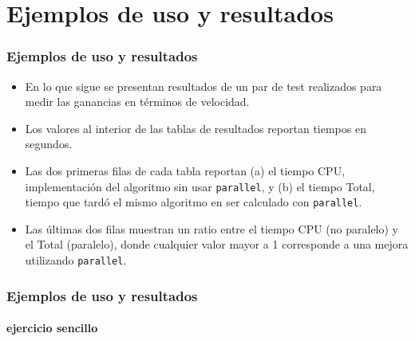 \documentclass{beamer}
\begin{document}
\section{Ejemplos de uso y resultados}

\begin{frame}
\frametitle{Ejemplos de uso y resultados}

\begin{itemize}
\item En lo que sigue se presentan resultados de un par de test realizados para medir las ganancias en t\'erminos de velocidad.
\item Los valores al interior de las tablas de resultados reportan tiempos en segundos.
\item Las dos primeras filas de cada tabla reportan (a) el tiempo CPU, implementaci\'on del algoritmo sin usar {\tt parallel}, y (b) el tiempo Total, tiempo que tard\'o el mismo algoritmo en ser calculado con {\tt parallel}.
\item Las \'ultimas dos filas muestran un ratio entre el tiempo CPU (no paralelo) y el Total (paralelo), donde cualquier valor mayor a 1 corresponde a una mejora utilizando {\tt parallel}.
\end{itemize}

\end{frame}


\begin{frame}
\frametitle{Ejemplos de uso y resultados}
\framesubtitle{ejercicio sencillo}

\begin{table}[!h]
\centering
\caption{Reemplazando valores de forma serial en un servidor Linux (16 clusters)\label{tab:serialreplace_linux}}
\end{table}

\end{frame}
\end{document}
